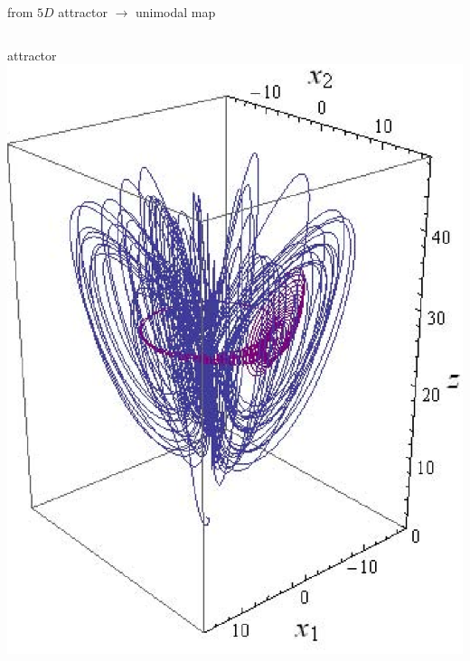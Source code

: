 \documentclass{beamer}
\begin{document}
\begin{frame}{from {\cLf} $5D$ attractor $\to$ unimodal map}
\begin{columns}[t]
{\begin{exampleblock}{attractor}
        \includegraphics[width=\textwidth,clip=true]
                        {../../Fig/CLEx1x2zRelEqu}
		\end{exampleblock}
        }
\end{columns}
\end{frame}
\end{document}
